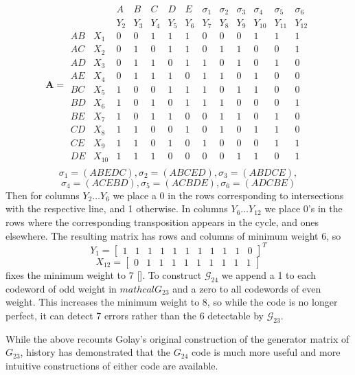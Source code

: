 \documentclass[paper=a4, fontsize=11pt]{scrartcl} %
\numberwithin{equation}{section} %
\numberwithin{figure}{section} %
\numberwithin{table}{section} %
\begin{document}
$$\textbf{A} = \begin{array}{ccccccccccccc}
&&       A  &  B  &  C  &  D  &  E &\sigma_1&\sigma_2&\sigma_3&\sigma_4&\sigma_5&\sigma_6\\
&&      Y_2 & Y_3 & Y_4 & Y_5 & Y_6 & Y_7 & Y_8 & Y_9 & Y_{10} & Y_{11} & Y_{12} \\
AB &    X_1 & 0 & 0 & 1 & 1 & 1 & 0 & 0 & 0 & 1 & 1 & 1\\
AC &    X_2 & 0 & 1 & 0 & 1 & 1 & 0 & 1 & 1 & 0 & 0 & 1\\
AD &    X_3 & 0 & 1 & 1 & 0 & 1 & 1 & 0 & 1 & 0 & 1 & 0\\
AE &    X_4 & 0 & 1 & 1 & 1 & 0 & 1 & 1 & 0 & 1 & 0 & 0\\
BC &    X_5 & 1 & 0 & 0 & 1 & 1 & 1 & 0 & 1 & 1 & 0 & 0\\
BD &    X_6 & 1 & 0 & 1 & 0 & 1 & 1 & 1 & 0 & 0 & 0 & 1\\
BE &    X_7 & 1 & 0 & 1 & 1 & 0 & 0 & 1 & 1 & 0 & 1 & 0\\
CD &    X_8 & 1 & 1 & 0 & 0 & 1 & 0 & 1 & 0 & 1 & 1 & 0\\
CE &    X_9 & 1 & 1 & 0 & 1 & 0 & 1 & 0 & 0 & 0 & 1 & 1\\
DE & X_{10} & 1 & 1 & 1 & 0 & 0 & 0 & 0 & 1 & 1 & 0 & 1\\
\end{array}$$
$$\sigma_1=(ABEDC), \sigma_2=(ABCED), \sigma_3=(ABDCE),$$
$$\sigma_4=(ACEBD), \sigma_5=(ACBDE), \sigma_6=(ADCBE)$$
Then for columns $Y_2 \ldots Y_6$ we place a 0 in the rows corresponding to intersections with the respective line, and 1 otherwise. In columns $Y_6 \ldots Y_{12}$ we place 0's in the rows where the corresponding transposition appears in the cycle, and ones elsewhere. The resulting matrix has rows and columns of minimum weight 6, so 
$$Y_1 = [ \begin{array}{ccccccccccc} 1& 1& 1& 1& 1& 1& 1& 1& 1& 1& 0\end{array}]^T$$
$$X_{12} = [\begin{array}{cccccccccccc} 0& 1& 1& 1& 1& 1& 1& 1& 1& 1\end{array}]$$ fixes the minimum weight to 7 [\cite{thompson}]. To construct $\mathcal{G}_{24}$ we append a 1 to each codeword of odd weight in $mathcal{G}_{23}$ and a zero to all codewords of even weight. This increases the minimum weight to 8, so while the code is no longer perfect, it can detect 7 errors rather than the 6 detectable by $\mathcal{G}_{23}$.

While the above recounts Golay's original construction of the generator matrix of $G_{23}$, history has demonstrated that the $G_{24}$ code is much more useful and more intuitive constructions of either code are available.
\end{document}
